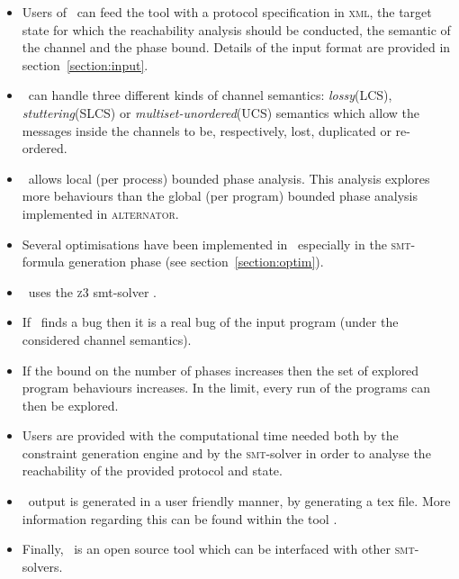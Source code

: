 \begin{itemize}
\item Users of \MPass\ can feed the tool with a protocol specification in \textsc{xml}, the target state for which the reachability analysis should be conducted, the semantic of the channel and the phase bound. Details of the input format are provided in section~\ref{section:input}.
%
\item \MPass\ can handle three different kinds of channel semantics: {\it lossy}(LCS), {\it stuttering}(SLCS) or {\it multiset-unordered}(UCS) semantics which allow the messages inside the channels to be, respectively, lost, duplicated or re-ordered.
\item \MPass\ allows local (per process) bounded phase analysis.
This analysis explores more behaviours than the global (per program) bounded phase analysis implemented in \textsc{alternator}.
%
\item Several optimisations have been implemented in \MPass\, especially in the \textsc{smt}-formula generation phase (see section~\ref{section:optim}).
%
\item \MPass\ uses the \textsc{z3} {\sc smt}-solver \cite{z3}.
\item If \MPass\ finds a bug then it is a real bug of the input program (under the considered channel semantics).
%
\item If the bound on the number of phases increases then the set of explored program behaviours increases.
In the limit, every run of the programs can then be explored.
\item Users are provided with the computational time needed both by the constraint generation engine and by
  the \textsc{smt}-solver in order to analyse the reachability of the provided protocol and state.
%
\item \MPass\ output is generated in a user friendly manner, by generating a tex file.
More information regarding this can be found within the tool \cite{github.MPass}.
%
\item Finally, \MPass\ is an open source tool which can be interfaced with other \textsc{smt}-solvers.
\end{itemize}


